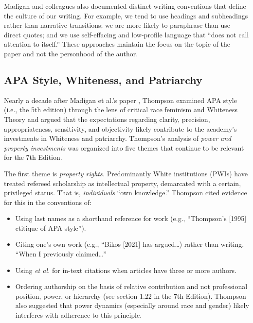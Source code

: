 \documentclass[
  11pt,
]{book}
\providecommand{\tightlist}{%
  \setlength{\itemsep}{0pt}\setlength{\parskip}{0pt}}
\begin{document}
Madigan \citep{madigan_language_1995} and colleagues also documented distinct writing conventions that define the culture of our writing. For example, we tend to use headings and subheadings rather than narrative transitions; we are more likely to paraphrase than use direct quotes; and we use self-effacing and low-profile language that ``does not call attention to itself.'' These approaches maintain the focus on the topic of the paper and not the personhood of the author.

\subsection{APA Style, Whiteness, and Patriarchy}\label{apa-style-whiteness-and-patriarchy}

Nearly a decade after Madigan et al.'s paper \citeyearpar{madigan_language_1995}, Thompson \citeyearpar{thompson_gentlemanly_2004} examined APA style (i.e., the 5th edition) through the lens of critical race feminism and Whiteness Theory and argued that the expectations regarding clarity, precision, appropriateness, sensitivity, and objectivity likely contribute to the academy's investments in Whiteness and patriarchy. Thompson's analysis of \emph{power and property investments} was organized into five themes that continue to be relevant for the 7th Edition.

The first theme is \emph{property rights.} Predominantly White institutions (PWIs) have treated refereed scholarship as intellectual property, demarcated with a certain, privileged status. That is, \emph{individuals} ``own knowledge.'' Thompson \citeyearpar{thompson_gentlemanly_2004} cited evidence for this in the conventions of:

\begin{itemize}
\tightlist
\item
  Using last names as a shorthand reference for work (e.g., ``Thompson's {[}1995{]} ctitique of APA style'').
\item
  Citing one's own work (e.g., ``Bikos {[}2021{]} has argued\ldots) rather than writing, ``When I previously claimed\ldots{}''
\item
  Using \emph{et al.} for in-text citations when articles have three or more authors.
\item
  Ordering authorship on the basis of relative contribution and not professional position, power, or hierarchy (see section 1.22 in the 7th Edition). Thompson \citeyearpar{thompson_gentlemanly_2004} also suggested that power dynamics (especially around race and gender) likely interferes with adherence to this principle.
\end{itemize}
\end{document}
